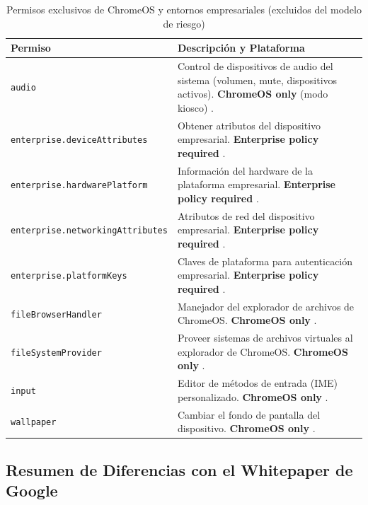 \documentclass[12pt,oneside]{report}
\begin{document}
\begin{table}[H]
\centering
\small
\begin{tabularx}{\textwidth}{|p{5.5cm}|X|}
\hline
\textbf{Permiso} & \textbf{Descripción y Plataforma} \\
\hline
\texttt{audio} & Control de dispositivos de audio del sistema (volumen, mute, dispositivos activos). \textbf{ChromeOS only} (modo kiosco) \cite{chrome_permissions_list}. \\
\hline
\texttt{enterprise.deviceAttributes} & Obtener atributos del dispositivo empresarial. \textbf{Enterprise policy required} \cite{chrome_permissions_list}. \\
\hline
\texttt{enterprise.hardwarePlatform} & Información del hardware de la plataforma empresarial. \textbf{Enterprise policy required} \cite{chrome_permissions_list}. \\
\hline
\texttt{enterprise.networkingAttributes} & Atributos de red del dispositivo empresarial. \textbf{Enterprise policy required} \cite{chrome_permissions_list}. \\
\hline
\texttt{enterprise.platformKeys} & Claves de plataforma para autenticación empresarial. \textbf{Enterprise policy required} \cite{chrome_permissions_list}. \\
\hline
\texttt{fileBrowserHandler} & Manejador del explorador de archivos de ChromeOS. \textbf{ChromeOS only} \cite{chrome_permissions_list}. \\
\hline
\texttt{fileSystemProvider} & Proveer sistemas de archivos virtuales al explorador de ChromeOS. \textbf{ChromeOS only} \cite{chrome_permissions_list}. \\
\hline
\texttt{input} & Editor de métodos de entrada (IME) personalizado. \textbf{ChromeOS only} \cite{chrome_permissions_list}. \\
\hline
\texttt{wallpaper} & Cambiar el fondo de pantalla del dispositivo. \textbf{ChromeOS only} \cite{chrome_permissions_list}. \\
\hline
\end{tabularx}
\caption{Permisos exclusivos de ChromeOS y entornos empresariales (excluidos del modelo de riesgo)}
\label{tab:chromeos_permissions}
\end{table}

\subsection{Resumen de Diferencias con el Whitepaper de Google}
\end{document}
